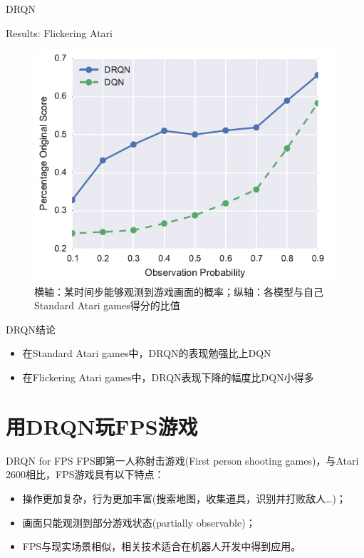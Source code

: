 \documentclass[10pt]{beamer}
\begin{document}
	\begin{frame}{DRQN}{Results: Flickering Atari 
	
}
		\begin{figure}
			\centering
			\includegraphics[width=0.7\linewidth]{pictures/flickering-atari-result}
			\caption{横轴：某时间步能够观测到游戏画面的概率；纵轴：各模型与自己Standard Atari games得分的比值}
			\label{fig:flickering-atari-result}
		\end{figure}
		
	\end{frame}

	\begin{frame}{DRQN}{结论}
		\begin{itemize}
				\item 在Standard Atari games中，DRQN的表现勉强比上DQN
				\item 在Flickering Atari games中，DRQN表现下降的幅度比DQN小得多
		\end{itemize}
	
	\end{frame}
	
	\section{用DRQN玩FPS游戏}

	\begin{frame}{DRQN for FPS}
		FPS即第一人称射击游戏(First person shooting games)，与Atari 2600相比，FPS游戏具有以下特点\cite{Lample17:RL4FPS}：
	 
		\begin{itemize}
			\item<2-> 操作更加复杂，行为更加丰富(搜索地图，收集道具，识别并打败敌人…)；
			\item<3-> 画面只能观测到部分游戏状态(partially observable)；
			\item<4-> FPS与现实场景相似，相关技术适合在机器人开发中得到应用。
		\end{itemize}
	\end{frame}
\end{document}
